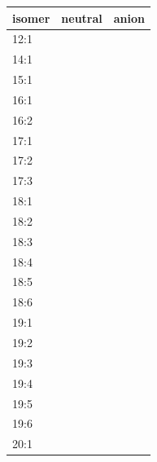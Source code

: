 \begin{figure}[p]
    \centering
	\begin{tabular}{lp{3cm}|p{3cm}}\toprule
		isomer  & \multicolumn{1}{c}{neutral} & \multicolumn{1}{c}{anion} \\ \midrule
		12:1    & \cellcolor{myorange}        & \cellcolor{myorange}      \\
		14:1    & \cellcolor{mygreen}         & \cellcolor{mygreen}       \\
		15:1    & \cellcolor{mygreen}         & \cellcolor{mygreen}       \\
		16:1    & \cellcolor{mygreen}         & \cellcolor{mygreen}       \\
		16:2    & \cellcolor{mygreen}         & \cellcolor{mygreen}       \\
		17:1    & \cellcolor{myorange}        & \cellcolor{mygreen}       \\
		17:2    & \cellcolor{mygreen}         & \cellcolor{mygreen}       \\
		17:3    & \cellcolor{mygreen}         & \cellcolor{mygreen}       \\
		18:1    & \cellcolor{mygreen}         & \cellcolor{mygreen}       \\
		18:2    & \cellcolor{mygreen}         & \cellcolor{mygreen}       \\
		18:3    & \cellcolor{mygreen}         & \cellcolor{myorange}      \\
		18:4    & \cellcolor{mygreen}         & \cellcolor{mygreen}       \\
		18:5    & \cellcolor{mygreen}         & \cellcolor{mygreen}       \\
		18:6    & \cellcolor{mygreen}         & \cellcolor{mygreen}       \\
		19:1    & \cellcolor{mygreen}         & \cellcolor{myorange}      \\
		19:2    & \cellcolor{mygreen}         & \cellcolor{myorange}      \\
		19:3    & \cellcolor{mygreen}         & \cellcolor{mygreen}       \\
		19:4    & \cellcolor{mygreen}         & \cellcolor{myorange}      \\
		19:5    & \cellcolor{mygreen}         & \cellcolor{myorange}      \\
		19:6    & \cellcolor{mygreen}         & \cellcolor{mygreen}       \\
		20:1    & \cellcolor{myorange}        & \cellcolor{myorange}      \\

\end{tabular}
\end{figure}
